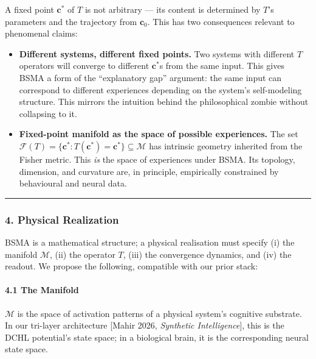 \documentclass[
  11pt,
  a4paper,
]{article}
\providecommand{\tightlist}{%
  \setlength{\itemsep}{0pt}\setlength{\parskip}{0pt}}
\begin{document}
A fixed point \(\mathbf{c}^*\) of \(T\) is not arbitrary --- its content
is determined by \(T\)'s parameters and the trajectory from
\(\mathbf{c}_0\). This has two consequences relevant to phenomenal
claims:

\begin{itemize}
\tightlist
\item
  \textbf{Different systems, different fixed points.} Two systems with
  different \(T\) operators will converge to different \(\mathbf{c}^*\)s
  from the same input. This gives BSMA a form of the ``explanatory gap''
  argument: the same input can correspond to different experiences
  depending on the system's self-modeling structure. This mirrors the
  intuition behind the philosophical zombie without collapsing to it.
\item
  \textbf{Fixed-point manifold as the space of possible experiences.}
  The set
  \(\mathcal{F}(T) = \{\mathbf{c}^* : T(\mathbf{c}^*) = \mathbf{c}^*\} \subseteq \mathcal{M}\)
  has intrinsic geometry inherited from the Fisher metric. This
  \emph{is} the space of experiences under BSMA. Its topology,
  dimension, and curvature are, in principle, empirically constrained by
  behavioural and neural data.
\end{itemize}

\begin{center}\rule{0.5\linewidth}{0.5pt}\end{center}

\subsubsection{4. Physical Realization}\label{physical-realization}

BSMA is a mathematical structure; a physical realisation must specify
(i) the manifold \(\mathcal{M}\), (ii) the operator \(T\), (iii) the
convergence dynamics, and (iv) the readout. We propose the following,
compatible with our prior stack:

\paragraph{4.1 The Manifold}\label{the-manifold}

\(\mathcal{M}\) is the space of activation patterns of a physical
system's cognitive substrate. In our tri-layer architecture {[}Mahir
2026, \emph{Synthetic Intelligence}{]}, this is the DCHL potential's
state space; in a biological brain, it is the corresponding neural state
space.
\end{document}
